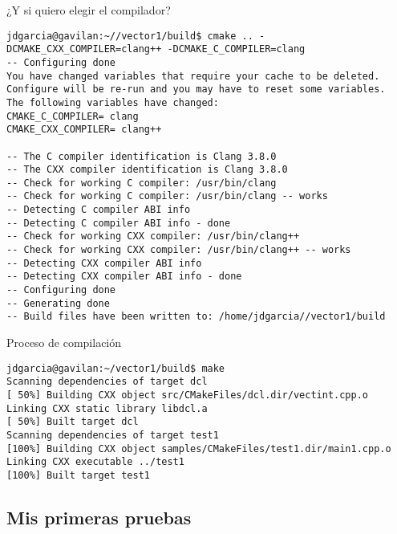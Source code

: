 \begin{frame}[t,fragile]{¿Y si quiero elegir el compilador?}
\begin{lstlisting}[style=terminal,basicstyle=\tiny\ttfamily]
jdgarcia@gavilan:~//vector1/build$ cmake .. -DCMAKE_CXX_COMPILER=clang++ -DCMAKE_C_COMPILER=clang
-- Configuring done
You have changed variables that require your cache to be deleted.
Configure will be re-run and you may have to reset some variables.
The following variables have changed:
CMAKE_C_COMPILER= clang
CMAKE_CXX_COMPILER= clang++

-- The C compiler identification is Clang 3.8.0
-- The CXX compiler identification is Clang 3.8.0
-- Check for working C compiler: /usr/bin/clang
-- Check for working C compiler: /usr/bin/clang -- works
-- Detecting C compiler ABI info
-- Detecting C compiler ABI info - done
-- Check for working CXX compiler: /usr/bin/clang++
-- Check for working CXX compiler: /usr/bin/clang++ -- works
-- Detecting CXX compiler ABI info
-- Detecting CXX compiler ABI info - done
-- Configuring done
-- Generating done
-- Build files have been written to: /home/jdgarcia//vector1/build
\end{lstlisting}
\end{frame}

\begin{frame}[t,fragile]{Proceso de compilación}
\begin{lstlisting}[style=terminal,basicstyle=\tiny\ttfamily]
jdgarcia@gavilan:~/vector1/build$ make
Scanning dependencies of target dcl
[ 50%] Building CXX object src/CMakeFiles/dcl.dir/vectint.cpp.o
Linking CXX static library libdcl.a
[ 50%] Built target dcl
Scanning dependencies of target test1
[100%] Building CXX object samples/CMakeFiles/test1.dir/main1.cpp.o
Linking CXX executable ../test1
[100%] Built target test1
\end{lstlisting}
\end{frame}

\subsection{Mis primeras pruebas}

